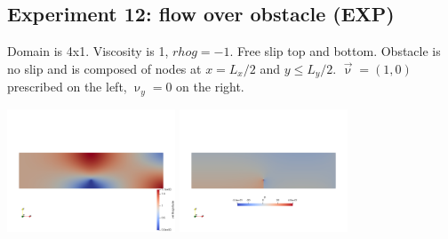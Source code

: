 \newpage
\subsection*{Experiment 12: flow over obstacle (EXP)}

Domain is 4x1. Viscosity is 1, $rho g = -1$. Free slip top and bottom.
Obstacle is no slip and is composed of nodes at $x=L_x/2$ and $y\le L_y/2$.
$\vec\upnu=(1,0)$ prescribed on the left, $\upnu_y=0$ on the right.

\begin{center}
\includegraphics[width=5cm]{python_codes/fieldstone_78/results/exp12/vel}
\includegraphics[width=5cm]{python_codes/fieldstone_78/results/exp12/p}
\end{center}

